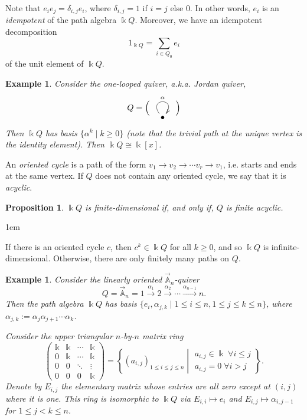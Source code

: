 \documentclass[11pt,a4paper]{article}
\makeatletter
\numberwithin{equation}{section}
\renewenvironment{proof}[1][\proofname]{\par
    \pushQED{\qed}%
    \normalfont \topsep0\p@\@plus6\p@ \labelsep1em\relax
    \trivlist
    \item[\hskip\labelsep\indent
        \bfseries #1]\ignorespaces
    \mbox{}
}{
    \popQED\endtrivlist\@endpefalse
}
\theoremstyle{all}
\newtheorem{proposition}[theorem]{Proposition}
\newtheorem{example}[theorem]{Example}
\theoremstyle{remark}
\newcommand{\linA}{\vec{\mathbb{A}}}
\newcommand{\defn}[1]{\textsl{\color{darkblue} #1}}
\makeatother
\begin{document}
Note that $e_i e_j = \delta_{i,j}e_i$, where $\delta_{i,j}=1$ if $i=j$ else $0$.
In other words, $e_i$ is an \defn{idempotent} of the path algebra $\Bbbk Q$.
Moreover, we have an idempotent decomposition
\[
1_{\Bbbk Q} = \sum_{i\in Q_0} e_i \]
of the unit element of $\Bbbk Q$.


\begin{example}
Consider the \defn{one-looped quiver}, a.k.a. \defn{Jordan quiver},
\[ Q= \Big(\quad \vcenter{\xymatrix{ \bullet \ar@(ul,ur)^{\alpha}}}\quad\Big) \]
Then $\Bbbk Q$ has basis $\{\alpha^k\mid k\geq 0\}$ (note that the trivial path at the unique vertex is the identity element).
Then $\Bbbk Q\cong \Bbbk[x]$.
\end{example}

An \defn{oriented cycle} is a path of the form $v_1\to v_2\to \cdots v_r\to v_1$, i.e. starts and ends at the same vertex.
If $Q$ does not contain any oriented cycle, we say that it is \defn{acyclic}.

\begin{proposition}
$\Bbbk Q$ is finite-dimensional if, and only if, $Q$ is finite acyclic.
\end{proposition}
\begin{proof}
If there is an oriented cycle $c$, then $c^k\in \Bbbk Q$ for all $k\geq 0$, and so $\Bbbk Q$ is infinite-dimensional.
Otherwise, there are only finitely many paths on $Q$.
\end{proof}


\begin{example}
Consider the linearly oriented $\linA_n$-quiver
\[
Q = \linA_n = 1 \xrightarrow{\alpha_1} 2 \xrightarrow{\alpha_2}\cdots \xrightarrow{\alpha_{n-1}} n .
\]
Then the path algebra $\Bbbk Q$ has basis $\{ e_i, \alpha_{j,k}\mid 1\leq i\leq n, 1\leq j\leq k\leq n \}$, where $\alpha_{j,k}:=\alpha_j\alpha_{j+1}\cdots \alpha_k$.

Consider the upper triangular $n$-by-$n$ matrix ring
\[
\begin{pmatrix}
\Bbbk & \Bbbk & \cdots & \Bbbk \\
0 & \Bbbk & \cdots & \Bbbk \\
0 & 0 & \ddots & \vdots \\
0 & 0 & 0 & \Bbbk
\end{pmatrix} = { \left\{(a_{i,j})_{1\leq i\leq j\leq n}\middle| \begin{array}{l}a_{i,j}\in \Bbbk \;\forall i\leq j\\
a_{i,j}=0\;\forall i>j \end{array}\right\} }.
\]
Denote by $E_{i,j}$ the elementary matrix whose entries are all zero except at $(i,j)$ where it is one.
This ring is isomorphic to $\Bbbk Q$ via $E_{i,i}\mapsto e_i$ and $E_{i,j}\mapsto \alpha_{i,j-1}$ for $1\leq j<k\leq n$.
\end{example}
\end{document}
